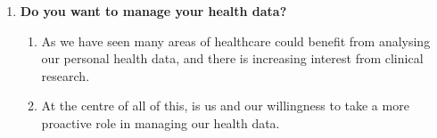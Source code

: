 \documentclass[10pt, twoside]{article}   	%
\begin{document}
\begin{enumerate}
\begin{enumerate}
\begin{enumerate}
            \end{enumerate}
    \end{enumerate}
\item \textbf{Do you want to manage your health data?}
    \begin{enumerate}
        \item As we have seen many areas of healthcare could benefit from analysing our personal health data, and there is increasing interest from clinical research.
        \item At the centre of all of this, is us and our willingness to take a more proactive role in managing our health data.
    \end{enumerate}
\end {enumerate}
\end{document}
